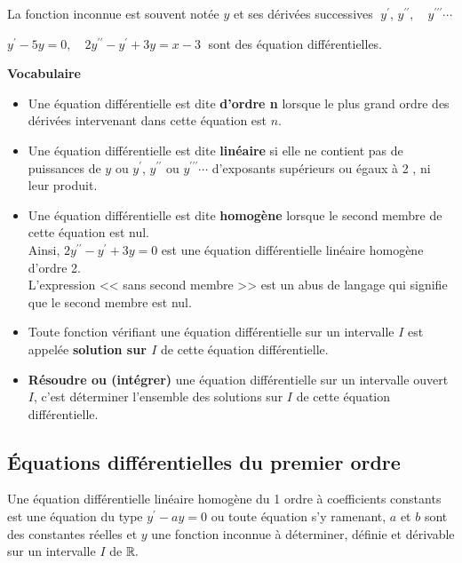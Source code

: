 \begin{notation}
La fonction inconnue est souvent notée $ y $ et ses dérivées successives $\;  y^{\prime}$, $y^{\prime \prime} ,\quad   y^{\prime \prime \prime} \cdots $
\end{notation}

\begin{example}
 $ y^{\prime } -5y=0,\quad  2y^{\prime \prime} -y^{\prime}+3y=x-3\; $ sont des équation différentielles.
\end{example}

\textbf{Vocabulaire}

  \begin{itemize}
\item  Une équation différentielle est dite \textbf{d'ordre n}  lorsque le plus grand ordre des dérivées intervenant dans cette équation est $ n $.
\item  Une équation différentielle est dite \textbf{linéaire}  si elle ne contient pas de puissances de $ y$ ou  $ y^{\prime}$, $y^{\prime \prime} $  ou  $y^{\prime \prime \prime} \cdots $ d'exposants supérieurs ou égaux à 2 , ni leur produit.
\item  Une équation différentielle est dite \textbf{homogène}  lorsque le second membre de cette équation est nul.\\
 Ainsi, \; $ 2y^{\prime \prime} -y^{\prime}+3y=0$ est une équation différentielle linéaire homogène d'ordre 2.\\
 L'expression << sans second membre >>  est un abus de langage qui signifie que le second membre  est nul.
\item Toute fonction vérifiant une équation différentielle  sur un intervalle $ I $  est appelée \textbf{solution sur $ I $} de cette équation différentielle.
\item \textbf{Résoudre ou (intégrer)} une équation différentielle sur un intervalle ouvert $ I $, c'est déterminer l'ensemble des solutions sur $ I $ de cette équation différentielle.
\end{itemize}


\subsection{Équations différentielles du premier ordre}
\begin{definition}
Une équation différentielle linéaire homogène du 1 ordre  à coefficients constants  est une équation du type  $ y^{\prime} -ay=0$\; ou toute équation s'y ramenant,  $a $ et $ b$ sont des constantes réelles et $ y $ une fonction inconnue à déterminer, définie et dérivable sur un intervalle $ I$ de  $ \mathbb{R}.$
\end{definition}
